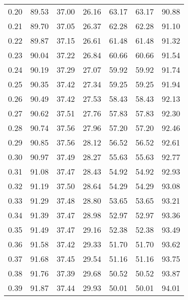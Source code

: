 \begin{tabular}{|c|c|c|c|c|c|c|}
      0.20 &     89.53 &     37.00 &      26.16 &   63.17 &      63.17 &         90.88 \\
      0.21 &     89.70 &     37.05 &      26.37 &   62.28 &      62.28 &         91.10 \\
      0.22 &     89.87 &     37.15 &      26.61 &   61.48 &      61.48 &         91.32 \\
      0.23 &     90.04 &     37.22 &      26.84 &   60.66 &      60.66 &         91.54 \\
      0.24 &     90.19 &     37.29 &      27.07 &   59.92 &      59.92 &         91.74 \\
      0.25 &     90.35 &     37.42 &      27.34 &   59.25 &      59.25 &         91.94 \\
      0.26 &     90.49 &     37.42 &      27.53 &   58.43 &      58.43 &         92.13 \\
      0.27 &     90.62 &     37.51 &      27.76 &   57.83 &      57.83 &         92.30 \\
      0.28 &     90.74 &     37.56 &      27.96 &   57.20 &      57.20 &         92.46 \\
      0.29 &     90.85 &     37.56 &      28.12 &   56.52 &      56.52 &         92.61 \\
      0.30 &     90.97 &     37.49 &      28.27 &   55.63 &      55.63 &         92.77 \\
      0.31 &     91.08 &     37.47 &      28.43 &   54.92 &      54.92 &         92.93 \\
      0.32 &     91.19 &     37.50 &      28.64 &   54.29 &      54.29 &         93.08 \\
      0.33 &     91.29 &     37.48 &      28.80 &   53.65 &      53.65 &         93.21 \\
      0.34 &     91.39 &     37.47 &      28.98 &   52.97 &      52.97 &         93.36 \\
      0.35 &     91.49 &     37.47 &      29.16 &   52.38 &      52.38 &         93.49 \\
      0.36 &     91.58 &     37.42 &      29.33 &   51.70 &      51.70 &         93.62 \\
      0.37 &     91.68 &     37.45 &      29.54 &   51.16 &      51.16 &         93.75 \\
      0.38 &     91.76 &     37.39 &      29.68 &   50.52 &      50.52 &         93.87 \\
      0.39 &     91.87 &     37.44 &      29.93 &   50.01 &      50.01 &         94.01 \\

\end{tabular}
